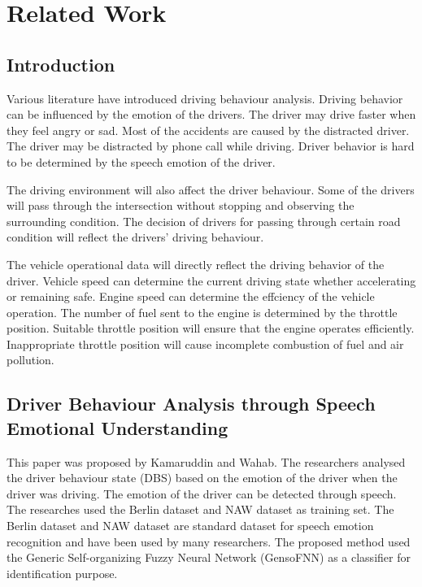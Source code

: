 \chapter{Related Work}
\section{Introduction}
Various literature have introduced driving behaviour analysis. Driving behavior can be influenced by the emotion of the drivers. The driver may drive faster when they feel angry or sad. Most of the accidents are caused by the distracted driver. The driver may be distracted by phone call while driving. Driver behavior is hard to be determined by the speech emotion of the driver.\cite{kamaruddin:wahab:2010}

The driving environment will also affect the driver behaviour. Some of the drivers will pass through the intersection without stopping and observing the surrounding condition. The decision of drivers for passing through certain road condition will reflect the drivers' driving behaviour.

The vehicle operational data will directly reflect the driving behavior of the driver. Vehicle speed can determine the current driving state whether accelerating or remaining safe. Engine speed can determine the effciency of the vehicle operation. The number of fuel sent to the engine is determined by the throttle position. Suitable throttle position will ensure that the engine operates efficiently. Inappropriate throttle position will cause incomplete combustion of fuel and air pollution.\cite{chen:pan:lu:2015}   

\section{Driver Behaviour Analysis through Speech Emotional Understanding}
This paper was proposed by Kamaruddin and Wahab\citeyear{kamaruddin:wahab:2010}. The researchers analysed the driver behaviour state (DBS) based on the emotion of the driver when the driver was driving. The emotion of the driver can be detected through speech. 
The researches used the Berlin dataset and NAW dataset as training set. The Berlin dataset and NAW dataset are standard dataset for speech emotion recognition and have been used by many researchers.
The proposed method used the Generic Self-organizing Fuzzy Neural Network (GensoFNN) as a classifier for identification purpose. 
